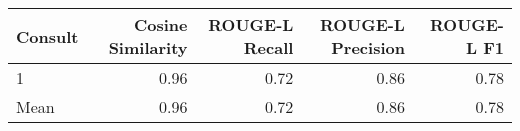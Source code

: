 \begin{tabular}{lrrrr}
\toprule
Consult & Cosine Similarity & ROUGE-L Recall & ROUGE-L Precision & ROUGE-L F1 \\
\midrule
1 & 0.96 & 0.72 & 0.86 & 0.78 \\
Mean & 0.96 & 0.72 & 0.86 & 0.78 \\
\bottomrule
\end{tabular}

